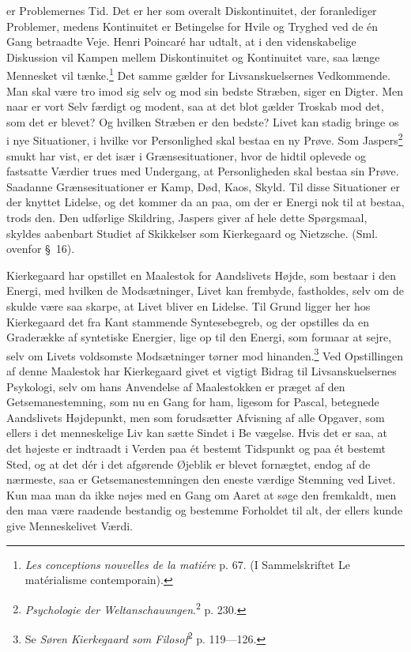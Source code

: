 \documentclass[12pt]{article}
\newcommand{\opage}[1]{\marginnote{\footnotesize\textit{[#1]}}}
\begin{document}
er Problemernes Tid. Det er her som overalt Diskontinuitet, der
foranlediger Problemer, medens Kontinuitet er Betingelse for Hvile og
Tryghed ved de én Gang betraadte Veje. Henri Poincaré har udtalt, at i
den videnskabelige Diskussion vil Kampen mellem Diskontinuitet og
Kontinuitet vare, saa længe Mennesket vil tænke.\footnote{\textit{Les
conceptions nouvelles de la matiére} p. 67.%
 (I Sammelskriftet
\guillemotright{}Le matérialisme contemporain\guillemotleft{}).} Det samme gælder for
Livsanskuelsernes Vedkommende. Man
\setcounter{footnote}{0}%
\opage{59}skal være \guillemotright{}tro imod sig selv og mod sin bedste Stræben\guillemotleft{},
siger en Digter. Men naar er vort Selv færdigt og modent, saa at det
blot gælder Troskab mod det, som det er blevet? Og hvilken Stræben er
den bedste? Livet kan stadig bringe os i nye Situationer, i hvilke vor
Personlighed skal bestaa en ny Prøve. Som Jaspers\footnote{\textit{Psychologie
der Weltanschauungen}.\textsuperscript{2} p. 230.} smukt har vist, er
det især i \guillemotright{}Grænsesituationer\guillemotleft{}, hvor de hidtil oplevede og fastsatte
Værdier trues med Undergang, at Personligheden skal bestaa sin Prøve.
Saadanne \guillemotright{}Grænsesituationer\guillemotleft{} er Kamp, Død, Kaos, Skyld. Til disse
Situationer er der knyttet Lidelse, og det kommer da an paa, om der er
Energi nok til at bestaa, trods den. Den udførlige Skildring, Jaspers
giver af hele dette Spørgsmaal, skyldes aabenbart Studiet af Skikkelser
som Kierkegaard og Nietzsche. (Sml. ovenfor \S~16).

Kierkegaard har opstillet en Maalestok for Aandslivets Højde, som
bestaar i den Energi, med hvilken de Modsætninger, Livet kan frembyde,
fastholdes, selv om de skulde være saa skarpe, at Livet bliver en
Lidelse. Til Grund ligger her hos Kierkegaard det fra Kant stammende
Syntesebegreb, og der opstilles da en Graderække af syntetiske
Energier, lige op til den Energi, som formaar at sejre, selv om Livets
voldsomste Modsætninger tørner mod hinanden.\footnote{Se \textit{Søren
Kierkegaard som Filosof}\textsuperscript{2} p. 119---126.} Ved
Opstillingen af denne Maalestok har Kierkegaard givet et vigtigt
Bidrag til Livsanskuelsernes Psykologi, selv om hans Anvendelse af
Maalestokken er præget af den Getsemanestemning, som nu en Gang for
ham, ligesom for Pascal, betegnede Aandslivets Højdepunkt, men som
forudsætter Afvisning af alle Opgaver, som ellers i det menneskelige
Liv kan sætte Sindet i Be%
\setcounter{footnote}{0}%
\opage{60}vægelse. Hvis det er saa, at det højeste er indtraadt i Verden
paa ét bestemt Tidspunkt og paa ét bestemt Sted, og at det dér i det
afgørende Øjeblik er blevet fornægtet, endog af de nærmeste, saa er
Getsemanestemningen den eneste værdige Stemning ved Livet. Kun maa man
da ikke nøjes med en Gang om Aaret at søge den fremkaldt, men den maa
være raadende bestandig og bestemme Forholdet til alt, der ellers
kunde give Menneskelivet Værdi.
\end{document}
